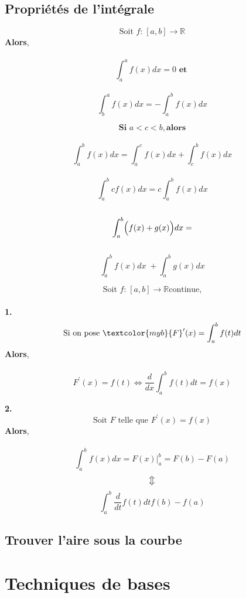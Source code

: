 \documentclass{report}
\begin{document}
\begin{multicols*}{3}
\section{Propriétés de l'intégrale}

\begin{Concept}{}{}

$$\text{Soit } f\text{:} \; [a,b] \rightarrow \mathbb{R}$$ \textbf{Alors}, \\\\
$$\int_{a}^{a}f(x)dx = 0 \textbf{ et }$$
\\
$$\int_{b}^{a}f(x)dx = - \int_{a}^{b}f(x)dx$$


\vspace{2em}
$$\textbf{Si } a < c < b,  \textbf{alors}$$ 
\\ 
$$\int_{a}^{b}f(x)dx = \int_{a}^{c}f(x)dx + \int_{c}^{b}f(x)dx $$ 
\\
$$\int_{a}^{b}cf(x)dx = c\int_{a}^{b}f(x)dx$$ 
\\

$$ \int_{a}^{b}\Bigl(f(x) + g(x)\Bigr)dx =$$ \\ 
$$\int_{a}^{b}f(x)dx \; +  \int_{a}^{b}g(x)dx$$
\end{Concept}

\begin{Definitionx*}{}{}
    $$\text{Soit } f\text{:} \; [a,b] \rightarrow \mathbb{R} \text{continue,}$$  \\ 
  \textbf{1. } $$\text{Si on pose } \textcolor{myb}{F}^{\prime}(x) = \int_{a}^{b}f(t)dt$$ \textbf{Alors}, \\\\ 
  $$F^{\prime}(x) = f(t) \Leftrightarrow \dfrac{d}{dx}\int_{a}^{b}f(t)dt = f(x)$$

  \vspace{2em}
  \textbf{2. } 
  $$\text{Soit } F \text{ telle que } F^{\prime}(x) = f(x)$$ \textbf{ Alors}, \\\\
  
  $$\int_{a}^{b}f(x)dx = F(x)  \bigg|_{a}^{b} = F(b) - F(a) $$
  $$\big\Updownarrow$$
  $$\int_{a}^{b}\dfrac{d}{dt}f(t)dt  f(b) - f(a)$$ 
\end{Definitionx*}


\section{Trouver l'aire sous la courbe}


\chapter{Techniques de bases}

\end{multicols*}
\end{document}
